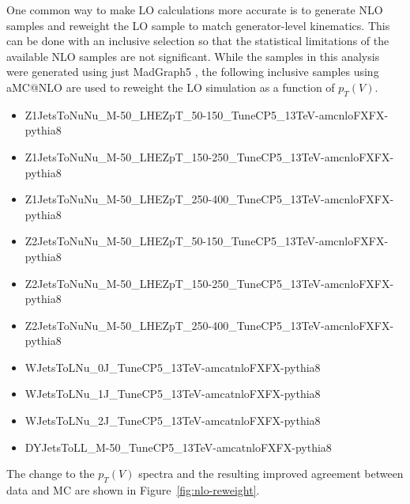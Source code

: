 One common way to make LO calculations more accurate
is to generate NLO samples and reweight the LO sample
to match generator-level kinematics.
This can be done with an inclusive selection so that the statistical limitations
of the available NLO samples are not significant.
While the samples in this analysis were generated using just
MadGraph5 \cite{hirschi2015automated},
the following inclusive samples using aMC@NLO \cite{Alwall:2014hca}
are used to reweight the LO simulation as a function of $p_T(V)$.
\begin{itemize}
\item Z1JetsToNuNu\_M-50\_LHEZpT\_50-150\_TuneCP5\_13TeV-amcnloFXFX-pythia8
\item Z1JetsToNuNu\_M-50\_LHEZpT\_150-250\_TuneCP5\_13TeV-amcnloFXFX-pythia8
\item Z1JetsToNuNu\_M-50\_LHEZpT\_250-400\_TuneCP5\_13TeV-amcnloFXFX-pythia8
\item Z2JetsToNuNu\_M-50\_LHEZpT\_50-150\_TuneCP5\_13TeV-amcnloFXFX-pythia8
\item Z2JetsToNuNu\_M-50\_LHEZpT\_150-250\_TuneCP5\_13TeV-amcnloFXFX-pythia8
\item Z2JetsToNuNu\_M-50\_LHEZpT\_250-400\_TuneCP5\_13TeV-amcnloFXFX-pythia8
\item WJetsToLNu\_0J\_TuneCP5\_13TeV-amcatnloFXFX-pythia8
\item WJetsToLNu\_1J\_TuneCP5\_13TeV-amcatnloFXFX-pythia8
\item WJetsToLNu\_2J\_TuneCP5\_13TeV-amcatnloFXFX-pythia8
\item DYJetsToLL\_M-50\_TuneCP5\_13TeV-amcatnloFXFX-pythia8
\end{itemize}
The change to the $p_T(V)$ spectra and the resulting improved agreement between data and MC
are shown in Figure~\ref{fig:nlo-reweight}.
